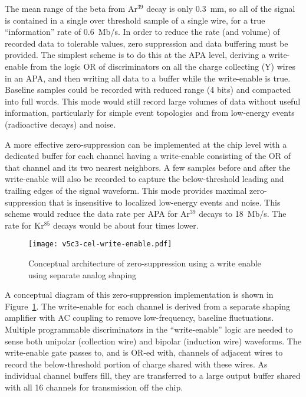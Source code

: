 The mean range of the beta from Ar$^{39}$ decay is only 0.3~mm, so all
of the signal is contained in a single over threshold sample of a single wire, for a true ``information''
rate of 0.6~Mb/s. In order to
reduce the rate (and volume) of recorded data to tolerable values, 
zero suppression and data buffering must be
provided.  The simplest scheme is to do this at the APA level, deriving
a write-enable from the logic OR of discriminators on all the charge
collecting (Y) wires in an APA, and then writing all data to a buffer
while the write-enable is true.  Baseline samples could be recorded
with reduced range (4 bits) and compacted into full words.  This mode
would still record large volumes of data without useful
information, particularly for simple event topologies and from low-energy 
events (radioactive decays) and noise. 

A more effective
zero-suppression can be implemented at the chip level with a dedicated buffer for each
channel having a write-enable consisting of the OR of  that channel and
its two nearest neighbors.  A few samples before and after the write-enable 
will also be recorded to capture the below-threshold leading
and trailing edges of the signal waveform.  This mode provides maximal
zero-suppression that is insensitive to localized low-energy events
and noise. This scheme would reduce the data rate per APA for Ar$^{39}$ decays to
18~Mb/s. The rate for Kr$^{85}$ decays would be about four times lower.

\begin{figure}[htbp]
\centering
\texttt{[image: v5c3-cel-write-enable.pdf]}
\caption[Conceptual architecture of zero-suppression]{Conceptual architecture of zero-suppression using a write enable using separate analog shaping}
\label{fig:tpc-elec-write-enable}
\end{figure}


A conceptual diagram of this zero-suppression implementation is shown
in Figure~\ref{fig:tpc-elec-write-enable}. The write-enable for each channel is derived from a separate
shaping amplifier with AC coupling to remove low-frequency, baseline
fluctuations. Multiple programmable discriminators in the
``write-enable'' logic are
needed to sense both unipolar (collection wire) and bipolar (induction
wire) waveforms.  The write-enable gate passes to, and is OR-ed with,
channels of adjacent wires to record the below-threshold portion of
charge shared with these wires. As individual channel buffers fill, they
are transferred to a large output buffer shared with all 16
channels for transmission off the chip.

